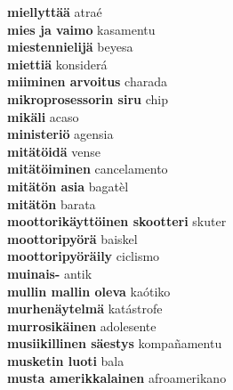 \textbf{ miellyttää  } atraé \\
\textbf{ mies ja vaimo  } kasamentu \\
\textbf{ miestennielijä  } beyesa \\
\textbf{ miettiä  } konsiderá \\
\textbf{ miiminen arvoitus  } charada \\
\textbf{ mikroprosessorin siru  } chip \\
\textbf{ mikäli  } acaso \\
\textbf{ ministeriö  } agensia \\
\textbf{ mitätöidä  } vense \\
\textbf{ mitätöiminen  } cancelamento \\
\textbf{ mitätön asia  } bagatèl \\
\textbf{ mitätön  } barata \\
\textbf{ moottorikäyttöinen skootteri  } skuter \\
\textbf{ moottoripyörä  } baiskel \\
\textbf{ moottoripyöräily  } ciclismo \\
\textbf{ muinais-  } antik \\
\textbf{ mullin mallin oleva  } kaótiko \\
\textbf{ murhenäytelmä  } katástrofe \\
\textbf{ murrosikäinen  } adolesente \\
\textbf{ musiikillinen säestys  } kompañamentu \\
\textbf{ musketin luoti  } bala \\
\textbf{ musta amerikkalainen  } afroamerikano \\
